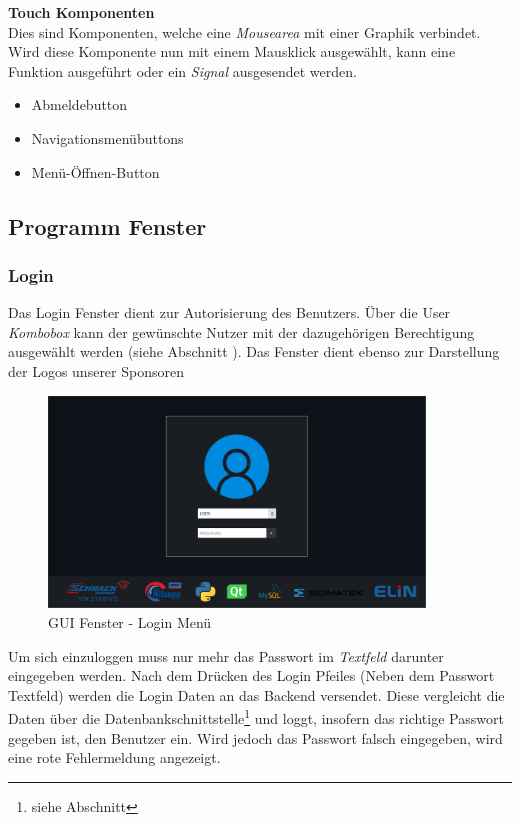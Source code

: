 \textbf{Touch Komponenten}\\
Dies sind Komponenten, welche eine \textit{Mousearea} mit einer Graphik verbindet. Wird diese Komponente nun mit einem Mausklick ausgewählt, kann eine Funktion ausgeführt oder ein \textit{Signal} ausgesendet werden.

\begin{itemize}
	
	\item Abmeldebutton
	\item Navigationsmenübuttons
	\item Menü-Öffnen-Button
	
\end{itemize}

\newpage

\subsection{Programm Fenster}

\subsubsection{Login}

Das Login Fenster dient zur Autorisierung des Benutzers. Über die User \textit{Kombobox} kann der gewünschte Nutzer mit der dazugehörigen Berechtigung ausgewählt werden (siehe Abschnitt ). Das Fenster dient ebenso zur Darstellung der Logos unserer Sponsoren\\

\begin{figure}[H]
	\begin{center}
		\includegraphics[width=10cm]{figures/hcis/window_login.png}
			\caption{GUI Fenster - Login Menü}
			\label{fig:pageMenu}
	\end{center}
\end{figure}

 Um sich einzuloggen muss nur mehr das Passwort im \textit{Textfeld} darunter eingegeben werden. Nach dem Drücken des Login Pfeiles (Neben dem Passwort Textfeld) werden die Login Daten an das Backend versendet. Diese vergleicht die Daten über die Datenbankschnittstelle\footnote{siehe Abschnitt} und loggt, insofern das richtige Passwort gegeben ist, den Benutzer ein. Wird jedoch das Passwort falsch eingegeben, wird eine rote Fehlermeldung angezeigt.\\
 
